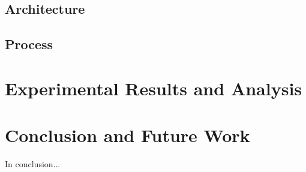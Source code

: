 \documentclass[12pt,letterpaper,oneside]{book}
\begin{document}
\section{Architecture}


\section{Process}


\chapter{Experimental Results and Analysis}

\chapter{Conclusion and Future Work}
	In conclusion...



\backmatter
	\singlespace
	
	 
	
	\clearpage
	
\end{document}
